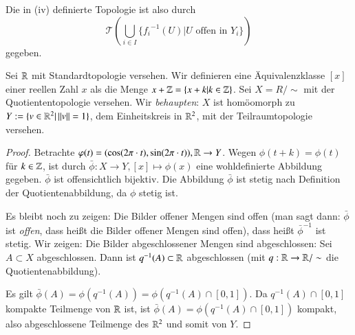 \documentclass[a4paper,10pt]{scrartcl}
\begin{document}
Die in (iv) definierte Topologie ist also durch
\[
\mathcal T(\bigcup\limits_{i\in I} \{ {f_i}^{-1}(U)|U \text{ offen in } Y_i\} )
\]
gegeben.
\begin{ex}\label{thm:2.6} Sei $ \mathbb{R} $ mit Standardtopologie versehen. Wir definieren eine Äquivalenzklasse $ [x] $ einer reellen Zahl $ x $ als die Menge $x+\mathbb{Z}=\{x+k|k\in \mathbb{Z}\}$. Sei $ X=R/\sim $ mit der Quotiententopologie versehen. Wir \emph{behaupten}: $ X $ ist homöomorph zu $ Y:=\{v\in \mathbb{R}^2|\, ||v||=1\} $, dem Einheitskreis in $ \mathbb{R}^2 $, mit der Teilraumtopologie versehen. 
\begin{figure}[H]
\centering
 \fixme[fig12]
\caption{}
\end{figure}
\begin{proof}
Betrachte $ \varphi(t)=(\cos(2\pi\cdot t),\sin(2\pi \cdot t)), \mathbb{R}\to Y $.
Wegen $ \phi(t+k)=\phi(t) $ für $ k\in \mathbb{Z} $, ist durch $ \bar\phi: X\to Y, [x]\mapsto \phi(x) $ eine wohldefinierte Abbildung gegeben. $\bar \phi$ ist offensichtlich bijektiv. Die Abbildung $ \bar \phi  $ ist stetig nach Definition der Quotientenabbildung, da $ \phi $ stetig ist.

Es bleibt noch zu zeigen: Die Bilder offener Mengen sind offen (man sagt dann: $ \bar \phi $ ist \emph{offen}, dass heißt die Bilder offener Mengen sind offen), dass heißt $ \bar \phi^{-1} $ ist stetig. Wir zeigen: Die Bilder abgeschlossener Mengen sind abgeschlossen: Sei $ A\subset X $ abgeschlossen. Dann ist $ q^{-1}(A)\subset \mathbb{R} $ abgeschlossen (mit $ q: \mathbb{R} \to \mathbb{R}/\sim $ die Quotientenabbildung).

Es gilt $ \bar \phi(A)=\phi(q^{-1}(A))=\phi(q^{-1}(A)\cap[0,1]) $. Da $ q^{-1}(A)\cap [0,1] $ kompakte Teilmenge von $ \mathbb{R} $ ist, ist $ \bar\phi(A)=\phi(q^{-1}(A)\cap[0,1]) $ kompakt, also abgeschlossene Teilmenge des $ \mathbb{R}^2  $ und somit von $ Y $.
\end{proof}
\end{ex}
\end{document}
